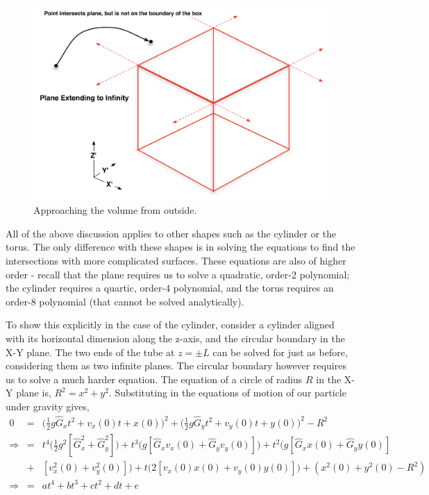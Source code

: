 \documentclass[11pt,a4paper,oneside]{article}
\begin{document}
\begin{figure}[!htbp] 
\begin{center}
\includegraphics[scale=0.4]{designdocumentimages/fig4-TimeFromOutside}
\end{center}
\caption{Approaching the volume from outside.}
\label{fig:TimeFromOutside}
\end{figure}

All of the above discussion applies to other shapes such as the cylinder or the torus. The only difference with these shapes is in solving the equations to find the intersections with more complicated surfaces. These equations are also of higher order - recall that the plane requires us to solve a quadratic, order-2 polynomial; the cylinder requires a quartic, order-4 polynomial, and the torus requires an order-8 polynomial (that cannot be solved analytically). 

To show this explicitly in the case of the cylinder, consider a cylinder aligned with its horizontal dimension along the z-axis, and the circular boundary in the X-Y plane. The two ends of the tube at $z = \pm L$ can be solved for just as before, considering them as two infinite planes. The circular boundary however requires us to solve a much harder equation. The equation of a circle of radius $R$ in the X-Y plane is, $R^{2} = x^{2} + y^{2}$. Substituting in the equations of motion of our particle under gravity gives, 
\begin{eqnarray}
0 &=& \Big(\frac{1}{2}g\hat{G}_{x}t^{2} + v_{x}(0)t + x(0)\Big)^{2} + \Big(\frac{1}{2}g\hat{G}_{y}t^{2} + v_{y}(0)t + y(0)\Big)^{2} - R^{2} \\
\Rightarrow &=& t^{4}\Big(\frac{1}{2}g^{2} \left[ \hat{G}_{x}^{2} + \hat{G}_{y}^{2} \right]\Big) + t^{3}\Big(g\left[ \hat{G}_{x} v_{x}(0) + \hat{G}_{y} v_{y}(0) \right]\Big) + t^{2} \Big( g \left[ \hat{G}_{x}x(0) + \hat{G}_{y}y(0) \right] \\ 
&+& \left[ v_{x}^{2}(0) + v_{y}^{2}(0) \right]\Big) + t\Big(2 \left[ v_{x}(0)x(0) + v_{y}(0)y(0) \right]\Big) + (x^{2}(0) + y^{2}(0) - R^{2}) \\
\Rightarrow &=& at^{4} + bt^{3} + ct^{2} + dt + e
\end{eqnarray}
\end{document}
